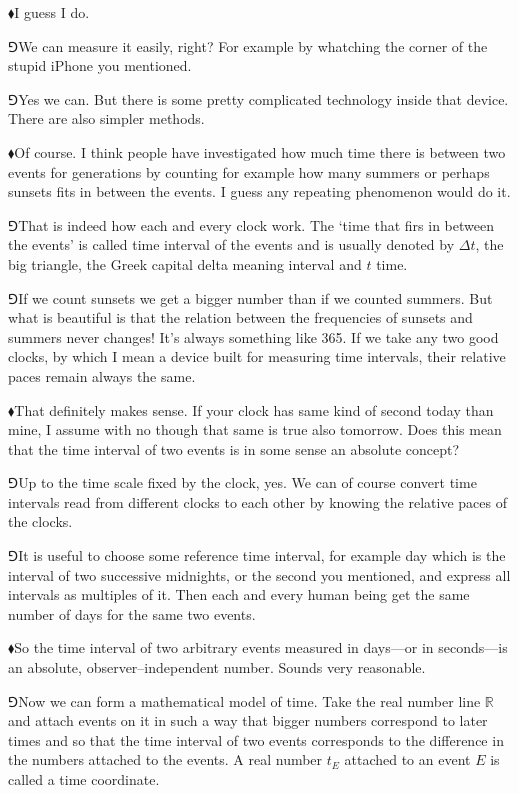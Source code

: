 \documentclass[11pt,oneside%
]{memoir}
\newcommand{\hea}{\(\blacklozenge\)\;}
\newcommand{\heb}{\(\Game\)\;}
\begin{document}
\hea I guess I do.

\heb We can measure it easily, right? For example by whatching the corner of the stupid iPhone you mentioned.

\heb Yes we can. But there is some pretty complicated technology inside that device. There are also simpler methods.

\hea Of course. I think people have investigated how much time there is between two events for generations by counting for example how many summers or perhaps sunsets fits in between the events. I guess any repeating phenomenon would do it.

\heb That is indeed how each and every clock work. The `time that firs in between the events' is called time interval of the events and is usually denoted by \(\Delta t\), the big triangle, the Greek capital delta meaning interval and \(t\) time.

\heb If we count sunsets we get a bigger number than if we counted summers. But what is beautiful is that the relation between the frequencies of sunsets and summers never changes! It's always something like 365. If we take any two good clocks, by which I mean a device built for measuring time intervals, their relative paces remain always the same.

\hea That definitely makes sense. If your clock has same kind of second today than mine, I assume with no though that same is true also tomorrow. Does this mean that the time interval of two events is in some sense an absolute concept?

\heb Up to the time scale fixed by the clock, yes. We can of course convert time intervals read from different clocks to each other by knowing the relative paces of the clocks.

\heb It is useful to choose some reference time interval, for example day which is the interval of two successive midnights, or the second you mentioned, and express all intervals as multiples of it. Then each and every human being get the same number of days for the same two events.

\hea So the time interval of two arbitrary events measured in days---or in seconds---is an absolute, observer--independent number. Sounds very reasonable.

\heb Now we can form a mathematical model of time. Take the real number line \(\mathbb{R}\) and attach events on it in such a way that bigger numbers correspond to later times and so that the time interval of two events corresponds to the difference in the numbers attached to the events. A real number \(t_E\) attached to an event \(E\) is called a time coordinate.
\end{document}
